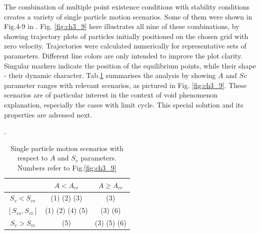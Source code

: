 \documentclass[../main.tex]{subfiles}
\begin{document}
The combination of multiple point existence conditions with stability conditions creates a variety of single particle motion scenarios. Some of them were shown in Fig.4-9 in \citet{Marcu1995}. Fig. \ref{fig:ch3_9} here illustrates all nine of these combinations, by showing trajectory plots of particles initially positioned on the chosen grid with zero velocity. Trajectories were calculated numerically for representative sets of parameters. Different line colors are only intended to improve the plot clarity. Singular markers indicate the position of the equilibrium points, while their shape - their dynamic character. Tab.\ref{tab:ch3_4} summarises the analysis by showing $A$ and $Sv$ parameter ranges with relevant scenarios, as pictured in Fig. \ref{fig:ch3_9}. These scenarios are of particular interest in the context of void phenomenon explanation, especially the cases with limit cycle. This special solution and its properties are adressed next.

\begin{table}
\small
\tabcolsep=0.2cm
\caption{Single particle motion scenarios with respect to $A$ and $S_v$ parameters. Numbers refer to Fig.\ref{fig:ch3_9}}.
\centering
\begin{tabular}{|c|c|c|}
\hline 
 & $A < A_{cr}$ & $A \geq A_{cr}$\\
\hline
$S_v<S_{v s}$ &(1) (2) (3) & (3)\\
\hline
$[S_{v s},S_{v i}]$ & (1) (2) (4) (5)& (3) (6)\\
\hline
$S_v>S_{v i}$ & (5) & (3) (5) (6)\\
\hline
\end{tabular}
\label{tab:ch3_4}
\end{table}
\end{document}
